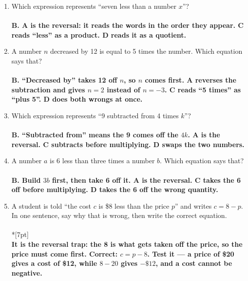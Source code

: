 \documentclass[11pt,a4paper]{article}
\newcommand{\ans}[1]{\ {\color{keyred}\bfseries #1}}
\newcommand{\ans}[1]{}
\begin{document}
\begin{enumerate}[leftmargin=20pt,itemsep=9pt]
\item Which expression represents ``seven less than a number $x$''?\\
  \ans{\\ B. A is the reversal: it reads the words in the order they appear. C reads
  ``less'' as a product. D reads it as a quotient.}

\item A number $n$ decreased by 12 is equal to 5 times the number. Which equation says
  that?\\
  \ans{\\ B. ``Decreased by'' takes 12 off $n$, so $n$ comes first. A reverses the
  subtraction and gives $n=2$ instead of $n=-3$. C reads ``5 times'' as ``plus 5''.
  D does both wrongs at once.}

\item Which expression represents ``9 subtracted from 4 times $k$''?\\
  \ans{\\ B. ``Subtracted from'' means the 9 comes off the $4k$. A is the reversal.
  C subtracts before multiplying. D swaps the two numbers.}

\item A number $a$ is 6 less than three times a number $b$. Which equation says that?\\
  \ans{\\ B. Build $3b$ first, then take 6 off it. A is the reversal. C takes the 6
  off before multiplying. D takes the 6 off the wrong quantity.}

\item A student is told ``the cost $c$ is \$8 less than the price $p$'' and writes
  $c=8-p$. In one sentence, say why that is wrong, then write the correct equation.\\
  \underline{\hspace{\linewidth}}\\*[7pt]
  \underline{\hspace{\linewidth}}
  \ans{\\ It is the reversal trap: the 8 is what gets taken off the price, so the price
  must come first. Correct: $c=p-8$. Test it --- a price of \$20 gives a cost of \$12,
  while $8-20$ gives $-\$12$, and a cost cannot be negative.}


\end{enumerate}
\end{document}
